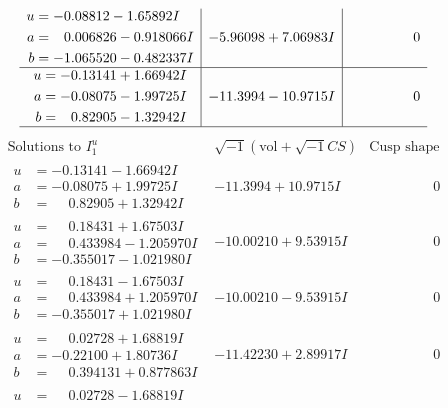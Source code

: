 \documentclass[1p]{elsarticle_modified}
\theoremstyle{definition}
\newcommand{\I}{\sqrt{-1}}
\begin{document}
$$\begin{array}{c|c|c}
\begin{aligned}
u &= -0.08812 - 1.65892 I \\
a &= \phantom{-}0.006826 - 0.918066 I \\
b &= -1.065520 - 0.482337 I\end{aligned}
 & -5.96098 + 7.06983 I & \phantom{-0.000000 } 0 \\ \hline\begin{aligned}
u &= -0.13141 + 1.66942 I \\
a &= -0.08075 - 1.99725 I \\
b &= \phantom{-}0.82905 - 1.32942 I\end{aligned}
 & -11.3994 - 10.9715 I & \phantom{-0.000000 } 0\\
 \hline 
 \end{array}$$\newpage$$\begin{array}{c|c|c}  
\text{Solutions to }I^u_{1}& \I (\text{vol} + \sqrt{-1}CS) & \text{Cusp shape}\\
 \hline 
\begin{aligned}
u &= -0.13141 - 1.66942 I \\
a &= -0.08075 + 1.99725 I \\
b &= \phantom{-}0.82905 + 1.32942 I\end{aligned}
 & -11.3994 + 10.9715 I & \phantom{-0.000000 } 0 \\ \hline\begin{aligned}
u &= \phantom{-}0.18431 + 1.67503 I \\
a &= \phantom{-}0.433984 - 1.205970 I \\
b &= -0.355017 - 1.021980 I\end{aligned}
 & -10.00210 + 9.53915 I & \phantom{-0.000000 } 0 \\ \hline\begin{aligned}
u &= \phantom{-}0.18431 - 1.67503 I \\
a &= \phantom{-}0.433984 + 1.205970 I \\
b &= -0.355017 + 1.021980 I\end{aligned}
 & -10.00210 - 9.53915 I & \phantom{-0.000000 } 0 \\ \hline\begin{aligned}
u &= \phantom{-}0.02728 + 1.68819 I \\
a &= -0.22100 + 1.80736 I \\
b &= \phantom{-}0.394131 + 0.877863 I\end{aligned}
 & -11.42230 + 2.89917 I & \phantom{-0.000000 } 0 \\ \hline\begin{aligned}
u &= \phantom{-}0.02728 - 1.68819 I \\

\end{aligned}
\end{array}$$
\end{document}
